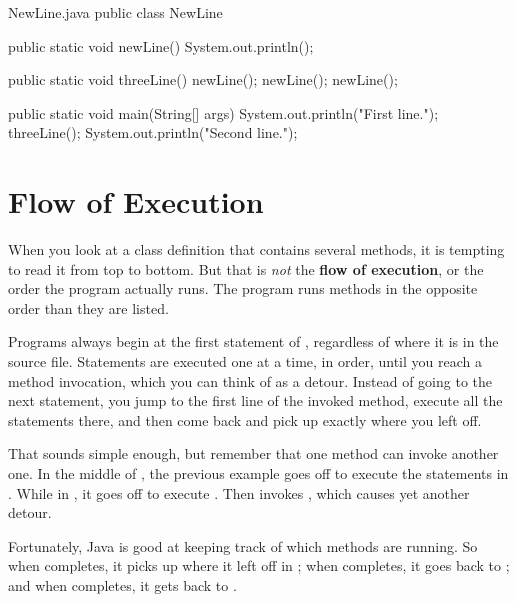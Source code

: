 \begin{trinket}{NewLine.java}
public class NewLine {

    public static void newLine() {
        System.out.println();
    }

    public static void threeLine() {
        newLine();
        newLine();
        newLine();
    }

    public static void main(String[] args) {
        System.out.println("First line.");
        threeLine();
        System.out.println("Second line.");
    }
}
\end{trinket}


\section{Flow of Execution}


When you look at a class definition that contains several methods, it is tempting to read it from top to bottom.
But that is {\em not} the {\bf flow of execution}, or the order the program actually runs.
The  program runs methods in the opposite order than they are listed.

Programs always begin at the first statement of , regardless of where it is in the source file.
Statements are executed one at a time, in order, until you reach a method invocation, which you can think of as a detour.
Instead of going to the next statement, you jump to the first line of the invoked method, execute all the statements there, and then come back and pick up exactly where you left off.

That sounds simple enough, but remember that one method can invoke another one.
In the middle of , the previous example goes off to execute the statements in .
While in , it goes off to execute .
Then  invokes , which causes yet another detour.

Fortunately, Java is good at keeping track of which methods are running.
So when  completes, it picks up where it left off in ; when  completes, it goes back to ; and when  completes, it gets back to .



